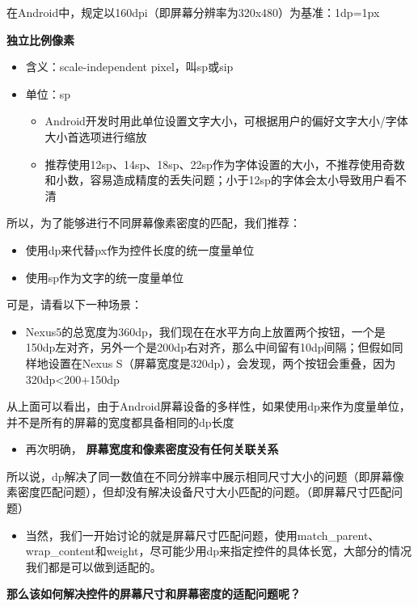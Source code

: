 \documentclass[9pt, b5paper]{article}
\begin{document}
\begin{enumerate}
\begin{enumerate}
在Android中，规定以160dpi（即屏幕分辨率为320x480）为基准：1dp=1px

\textbf{独立比例像素}
\begin{itemize}
\item 含义：scale-independent pixel，叫sp或sip
\item 单位：sp
\begin{itemize}
\item Android开发时用此单位设置文字大小，可根据用户的偏好文字大小/字体大小首选项进行缩放
\item 推荐使用12sp、14sp、18sp、22sp作为字体设置的大小，不推荐使用奇数和小数，容易造成精度的丢失问题；小于12sp的字体会太小导致用户看不清
\end{itemize}
\end{itemize}

所以，为了能够进行不同屏幕像素密度的匹配，我们推荐：
\begin{itemize}
\item 使用dp来代替px作为控件长度的统一度量单位
\item 使用sp作为文字的统一度量单位
\end{itemize}

可是，请看以下一种场景：
\begin{itemize}
\item Nexus5的总宽度为360dp，我们现在在水平方向上放置两个按钮，一个是150dp左对齐，另外一个是200dp右对齐，那么中间留有10dp间隔；但假如同样地设置在Nexus S（屏幕宽度是320dp），会发现，两个按钮会重叠，因为320dp<200+150dp
\end{itemize}

从上面可以看出，由于Android屏幕设备的多样性，如果使用dp来作为度量单位，并不是所有的屏幕的宽度都具备相同的dp长度
\begin{itemize}
\item 再次明确， \textbf{屏幕宽度和像素密度没有任何关联关系}
\end{itemize}

所以说，dp解决了同一数值在不同分辨率中展示相同尺寸大小的问题（即屏幕像素密度匹配问题），但却没有解决设备尺寸大小匹配的问题。（即屏幕尺寸匹配问题）
\begin{itemize}
\item 当然，我们一开始讨论的就是屏幕尺寸匹配问题，使用match\_parent、wrap\_content和weight，尽可能少用dp来指定控件的具体长宽，大部分的情况我们都是可以做到适配的。
\end{itemize}

\textbf{那么该如何解决控件的屏幕尺寸和屏幕密度的适配问题呢？}


\end{enumerate}
\end{enumerate}
\end{document}

